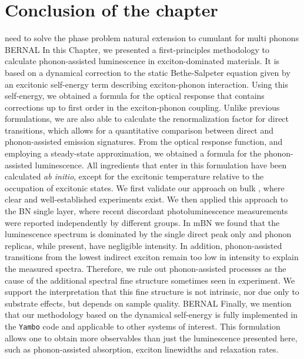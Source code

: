 \section*{Conclusion of the chapter}
need to solve the phase problem 
natural extension to cumulant for multi phonons
% 
BERNAL
%
%
In this Chapter, we presented a first-principles methodology to calculate phonon-assisted luminescence in exciton-dominated materials. It is based on a dynamical correction to the static Bethe-Salpeter equation given by an excitonic self-energy term describing exciton-phonon interaction. Using this self-energy, we obtained a formula for the optical response that contains corrections up to first order in the exciton-phonon coupling.
Unlike previous formulations, we are also able to calculate the renormalization factor for direct transitions, which allows for a quantitative comparison between direct and phonon-assisted emission signatures.
From the optical response function, and employing a steady-state approximation, we obtained a formula for the phonon-assisted luminescence. All ingredients that enter in this formulation have been calculated \emph{ab initio}, except for the excitonic temperature relative to the occupation of excitonic states.
We first validate our approach on bulk \hbn, where clear and well-established experiments exist. We then applied this approach to the BN single layer, where recent discordant photoluminescence measurements were reported independently by different groups. In mBN we found that the luminescence spectrum is dominated by the single direct peak only and phonon replicas, while present, have negligible intensity. In addition, 
phonon-assisted transitions from the lowest indirect exciton remain too low in intensity to explain the measured spectra. Therefore, we rule out phonon-assisted processes as the cause of the additional spectral fine structure sometimes seen in experiment.
We support the interpretation that this fine structure is not intrinsic, nor due only to substrate effects, but depends on sample quality.
BERNAL 
Finally, we mention that our methodology based on the dynamical self-energy is fully implemented in the \texttt{Yambo} code and applicable to other systems of interest. This formulation allows one to obtain more observables than just the luminescence presented here, such as phonon-assisted absorption, exciton linewidths and relaxation rates.
